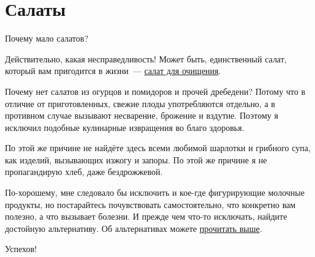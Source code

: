 \newpage
\section{Салаты}
\label{sec:salats}

Почему мало салатов?

Действительно, какая несправедливость!
Может быть, единственный салат, который вам пригодится в жизни~--- \hyperref[cleanSalad]{салат для очищения}.


Почему нет салатов из огурцов и помидоров и прочей дребедени? Потому что в отличие от приготовленных, свежие плоды употребляются отдельно, а в противном случае вызывают несварение, брожение и вздутие. Поэтому я исключил подобные кулинарные извращения во благо здоровья.

По этой же причине не найдёте здесь всеми любимой шарлотки и грибного супа, как изделий, вызывающих изжогу и запоры. По этой же причине я не пропагандирую хлеб, даже бездрожжевой.

По-хорошему, мне следовало бы исключить и кое-где фигурирующие молочные продукты, но постарайтесь почувствовать самостоятельно, что конкретно вам полезно, а что вызывает болезни. И прежде чем что-то исключать, найдите достойную альтернативу.
Об альтернативах можете \hyperref[sec:replace]{прочитать выше}.

Успехов!




